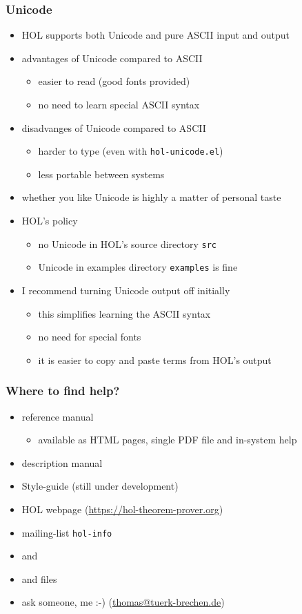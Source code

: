 \begin{frame}
\frametitle{Unicode}
\begin{itemize}
\item HOL supports both Unicode and pure ASCII input and output
\item advantages of Unicode compared to ASCII
\begin{itemize}
\item easier to read (good fonts provided)
\item no need to learn special ASCII syntax
\end{itemize}
\item disadvanges of Unicode compared to ASCII
\begin{itemize}
\item harder to type (even with \texttt{hol-unicode.el})
\item less portable between systems
\end{itemize}
\item whether you like Unicode is highly a matter of personal taste
\item HOL's policy
\begin{itemize}
\item no Unicode in HOL's source directory \texttt{src}
\item Unicode in examples directory \texttt{examples} is fine
\end{itemize}
\item I recommend turning Unicode output off initially
\begin{itemize}
\item this simplifies learning the ASCII syntax
\item no need for special fonts
\item it is easier to copy and paste terms from HOL's output
\end{itemize}
\end{itemize}
\end{frame}


\begin{frame}
\frametitle{Where to find help?}
\begin{itemize}
\item reference manual
\begin{itemize}
\item available as HTML pages, single PDF file and in-system help
\end{itemize}
\item description manual
\item Style-guide (still under development)
\item HOL webpage (\url{https://hol-theorem-prover.org})
\item mailing-list \texttt{hol-info}
\item {} and 
\item {} and  files
\item ask someone, \eg me :-) (\href{mailto:thomas@tuerk-brechen.de}{thomas@tuerk-brechen.de})
\end{itemize}
\end{frame}


